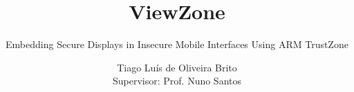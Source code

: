 \documentclass{./llncs2e/llncs}
\begin{document}
\title{ViewZone}

\subtitle{Embedding Secure Displays in Insecure Mobile Interfaces Using ARM TrustZone}
\author{Tiago Luís de Oliveira Brito\\
Supervisor: Prof. Nuno Santos}


\maketitle

\setcounter{secnumdepth}{3}
\setcounter{tocdepth}{3}
\makeatletter
\renewcommand*\l@author[2]{}
\renewcommand*\l@title[2]{}
\makeatletter
\renewcommand\subsubsection{\@startsection{subsubsection}{2}{\z@}%
	{-18\p@ \@plus -4\p@ \@minus -4\p@}%
	{8\p@ \@plus 4\p@ \@minus 4\p@}%
	{\normalfont\normalsize\bfseries\boldmath
		\rightskip=\z@ \@plus 8em\pretolerance=10000 }}


%

\pagestyle{plain}

%





%

%
%



%
\end{document}
